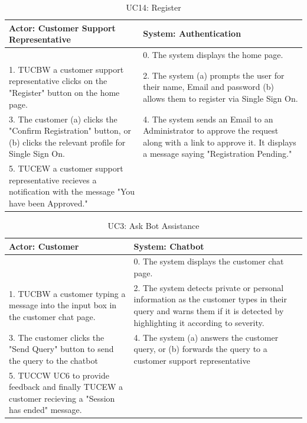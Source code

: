 \documentclass[11pt]{article}
\begin{document}
\begin{table}[H]
	\centering
	\begin{tabular}{|p{8cm}|p{8cm}|}
		\hline
		Actor: Customer Support Representative & System: Authentication \\
		\hline
		 & 0. The system displays the home page. \\
		\hline
		1. TUCBW a customer support representative clicks on the "Register" button on the home page. & 2. The system (a) prompts the user for their name, Email and password (b) allows them to register via Single Sign On. \\
		\hline
		3. The customer (a) clicks the "Confirm Registration" button, or (b) clicks the relevant profile for Single Sign On. & \cellcolor{blue} 4. The system sends an Email to an Administrator to approve the request along with a link to approve it. It displays a message saying "Registration Pending."\\
		\hline
		5. TUCEW a customer support representative recieves a notification with the message "You have been Approved." & \\
		\hline
	\end{tabular}
	\caption{UC14: Register}
\end{table}

\begin{table}[H]
	\centering
	\begin{tabular}{|p{8cm}|p{8cm}|}
		\hline
		Actor: Customer & System: Chatbot \\
		\hline
		 & 0. The system displays the customer chat page. \\
		\hline
		1. TUCBW a customer typing a message into the input box in the customer chat page. & \cellcolor{blue} 2. The system detects private or personal information as the customer types in their query and warns them if it is detected by highlighting it according to severity. \\
		\hline
		3. The customer clicks the "Send Query" button to send the query to the chatbot & \cellcolor{blue} 4. 	The system (a) answers the customer query, or (b) forwards the query to a customer support representative \\
		\hline
		5. \cellcolor{blue} TUCCW UC6 to provide feedback and finally TUCEW a customer recieving a "Session has ended" message. & \\
		\hline
	\end{tabular}
	\caption{UC3: Ask Bot Assistance}
\end{table}
\end{document}

